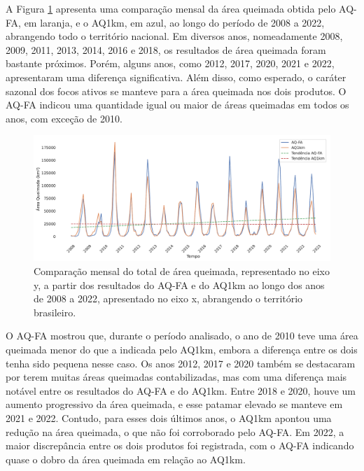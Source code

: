 \documentclass[cic,tc]{iiufrgs}
\begin{document}
A Figura \ref{fig:results_monthly} apresenta uma comparação mensal da área queimada obtida pelo AQ-FA, em laranja, e o AQ1km, em azul, ao longo do período de 2008 a 2022, abrangendo todo o território nacional. Em diversos anos, nomeadamente 2008, 2009, 2011, 2013, 2014, 2016 e 2018, os resultados de área queimada foram bastante próximos. Porém, alguns anos, como 2012, 2017, 2020, 2021 e 2022, apresentaram uma diferença significativa. Além disso, como esperado, o caráter sazonal dos focos ativos se manteve para a área queimada nos dois produtos. O AQ-FA indicou uma quantidade igual ou maior de áreas queimadas em todos os anos, com exceção de 2010.

\begin{figure}[!htb]
    \caption{Comparação mensal do total de área queimada, representado no eixo y, a partir dos resultados do AQ-FA e do AQ1km ao longo dos anos de 2008 a 2022, apresentado no eixo x, abrangendo o território brasileiro.}
    \begin{center}
        \includegraphics[width=35em]{compare_aq1km-aqfa-month}
    \end{center}
    \label{fig:results_monthly}
\end{figure}

O AQ-FA mostrou que, durante o período analisado, o ano de 2010 teve uma área queimada menor do que a indicada pelo AQ1km, embora a diferença entre os dois tenha sido pequena nesse caso. Os anos 2012, 2017 e 2020 também se destacaram por terem muitas áreas queimadas contabilizadas, mas com uma diferença mais notável entre os resultados do AQ-FA e do AQ1km. Entre 2018 e 2020, houve um aumento progressivo da área queimada, e esse patamar elevado se manteve em 2021 e 2022. Contudo, para esses dois últimos anos, o AQ1km apontou uma redução na área queimada, o que não foi corroborado pelo AQ-FA. Em 2022, a maior discrepância entre os dois produtos foi registrada, com o AQ-FA indicando quase o dobro da área queimada em relação ao AQ1km.
\end{document}
